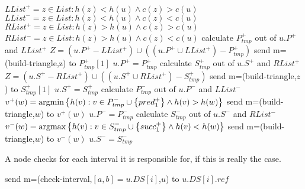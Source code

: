 \documentclass[11pt]{article}
\def\argmin{{\rm argmin}}
\def\argmax{{\rm argmax}}
\begin{document}
\begin{algorithm}

\begin{algorithmic}
\State $LList^+={z \in List: h(z)<h(u) \wedge c(z)>c(u)}$ 
\State $LList^-={z \in List: h(z)<h(u) \wedge c(z)<c(u)}$ 
\State $RList^+={z \in List: h(z)>h(u) \wedge c(z)>c(u)}$ 
\State $RList^-={z \in List: h(z)>h(u) \wedge c(z)<c(u)}$ 
\State calculate $P^+_{tmp}$ out of $u.P^+$ and $LList^+$ 
\State $Z=(u.P^+-LList^+) \cup ((u.P^+ \cup LList^+)-P^+_{tmp})$
\State send m=(build-triangle,z) to $P^+_{tmp}[1]$
\EndFor
\State $u.P^+=P^+_{tmp}$
\EndIf
\State calculate $S^+_{tmp}$ out of $u.S^+$ and $RList^+$
\State $Z=(u.S^+-RList^+) \cup ((u.S^+ \cup RList^+ )- S^+_{tmp})$
\State send m=(build-triangle,$z$) to $S^+_{tmp}[1]$
\EndFor
\State $u.S^+=S^+_{tmp}$
\EndIf
\State calculate $P^-_{tmp}$ out of $u.P^-$ and $LList^-$
\State $v^{+}(w)=\argmin \left\{h(v):v\in P^-_{tmp} \cup \left\{pred^+_1\right\}\wedge h(v)>h(w)\right\}$
\State send m=(build-triangle,$w$) to $v^{+}(w)$
\EndFor
\State $u.P^-=P^-_{tmp}$
\State calculate $S^-_{tmp}$ out of $u.S^-$ and $RList^-$
\State $v^{-}(w)=\argmax \left\{h(v):v\in S^-_{tmp} \cup \left\{succ^+_1\right\}\wedge h(v)< h(w)\right\}$
\State send m=(build-triangle,$w$) to $v^{-}(w)$
\EndFor
\State $u.S^-=S^-_{tmp}$
\EndFunction
\end{algorithmic}
\end{algorithm}




\begin{algorithm}
A node checks for each interval it is responsible for, if this is really the case.

\begin{algorithmic}
\State send m=(check-interval,$[a,b]=u.DS[i]$,$u$) to $u.DS[i].ref$
\EndFor
\EndFunction
\end{algorithmic}
\end{algorithm}
\end{document}
